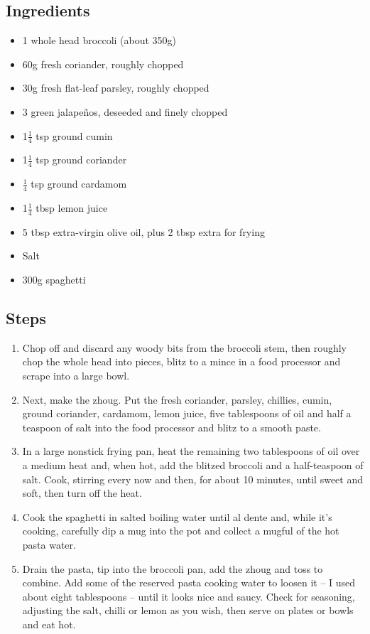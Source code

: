 \documentclass{book}
\begin{document}
\subsection*{Ingredients}
\begin{itemize}
\item 1 whole head broccoli (about 350g)
\item 60g fresh coriander, roughly chopped
\item 30g fresh flat-leaf parsley, roughly chopped
\item 3 green jalapeños, deseeded and finely chopped
\item 1$\frac{1}{4}$ tsp ground cumin
\item 1$\frac{1}{4}$ tsp ground coriander
\item $\frac{1}{4}$ tsp ground cardamom
\item 1$\frac{1}{4}$ tbsp lemon juice
\item 5 tbsp extra-virgin olive oil, plus 2 tbsp extra for frying
\item Salt 
\item 300g spaghetti
\end{itemize}

\subsection*{Steps}
\begin{enumerate}
\item Chop off and discard any woody bits from the broccoli stem, then roughly chop the whole head into pieces, blitz to a mince in a food processor and scrape into a large bowl.
\item Next, make the zhoug. Put the fresh coriander, parsley, chillies, cumin, ground coriander, cardamom, lemon juice, five tablespoons of oil and half a teaspoon of salt into the food processor and blitz to a smooth paste.
\item In a large nonstick frying pan, heat the remaining two tablespoons of oil over a medium heat and, when hot, add the blitzed broccoli and a half-teaspoon of salt. Cook, stirring every now and then, for about 10 minutes, until sweet and soft, then turn off the heat.
\item Cook the spaghetti in salted boiling water until al dente and, while it’s cooking, carefully dip a mug into the pot and collect a mugful of the hot pasta water.
\item Drain the pasta, tip into the broccoli pan, add the zhoug and toss to combine. Add some of the reserved pasta cooking water to loosen it – I used about eight tablespoons – until it looks nice and saucy. Check for seasoning, adjusting the salt, chilli or lemon as you wish, then serve on plates or bowls and eat hot.
\end{enumerate}
\newpage
\end{document}
